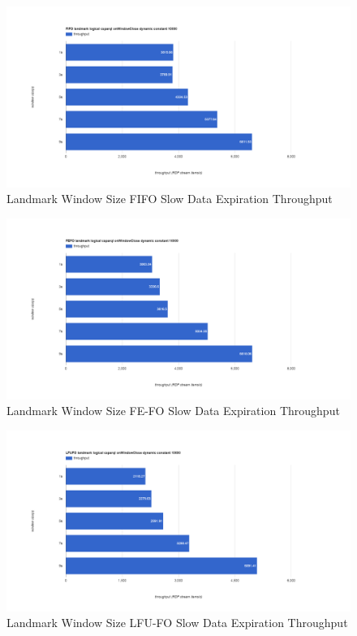\begin{figure}[!htbp]
    \centering
    \includegraphics[width=\textwidth]{img/app3-land-ws-fifo-slow-t.png}
    \caption{Landmark Window Size FIFO Slow Data Expiration Throughput}
\end{figure}
\begin{figure}[!htbp]
    \centering
    \includegraphics[width=\textwidth]{img/app3-land-ws-fefo-slow-t.png}
    \caption{Landmark Window Size FE-FO Slow Data Expiration Throughput}
\end{figure}
\begin{figure}[!htbp]
    \centering
    \includegraphics[width=\textwidth]{img/app3-land-ws-lfufo-slow-t.png}
    \caption{Landmark Window Size LFU-FO Slow Data Expiration Throughput}
\end{figure}

